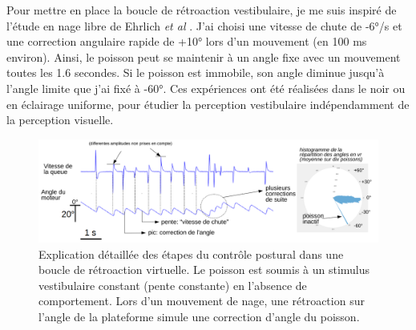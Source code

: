 Pour mettre en place la boucle de rétroaction vestibulaire, je me suis inspiré de l'étude en nage libre de Ehrlich \emph{et al} \cite{ehrlich_control_2017}. J'ai choisi une vitesse de chute de -6°/s et une correction angulaire rapide de +10° lors d'un mouvement (en 100 ms environ). Ainsi, le poisson peut se maintenir à un angle fixe avec un mouvement toutes les 1.6 secondes. Si le poisson est immobile, son angle diminue jusqu'à l'angle limite que j'ai fixé à -60°. Ces expériences ont été réalisées dans le noir ou en éclairage uniforme, pour étudier la perception vestibulaire indépendamment de la perception visuelle.

\begin{figure}
    \centering
    \includegraphics[width=\textwidth]{./files/vestibular_feedback.svg.png}
    \caption{Explication détaillée des étapes du contrôle postural dans une boucle de rétroaction virtuelle. Le poisson est soumis à un stimulus vestibulaire constant (pente constante) en l'absence de comportement. Lors d'un mouvement de nage, une rétroaction sur l'angle de la plateforme simule une correction d'angle du poisson.
    \label{FIGvirtualposturalcontrol}}
    \end{figure}

